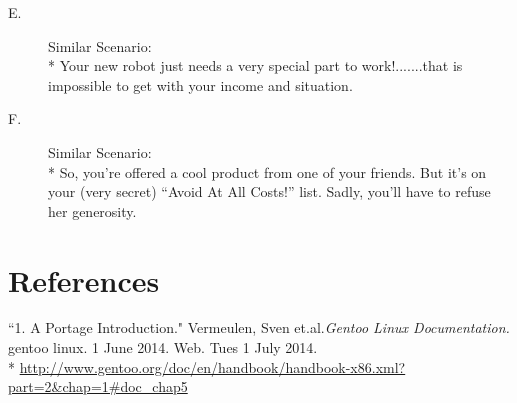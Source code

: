 \documentclass[11pt]{article}
\begin{document}
\begin{description}
   \item[E.] Similar Scenario:
    \\* Your new robot just needs a very special part to work!.......that is impossible to get with your income and situation.
    
   \item[F.] Similar Scenario:
    \\* So, you're offered a cool product from one of your friends. But it's on your (very secret) ``Avoid At All Costs!'' list. Sadly, you'll have to refuse her generosity.
  \end{description}
 
 \pagebreak
 \section*{References}
 ``1. A Portage Introduction." Vermeulen, Sven et.al.\textit{Gentoo Linux Documentation.} gentoo linux. 1 June 2014. Web. Tues 1 July 2014.
 \\* \url{http://www.gentoo.org/doc/en/handbook/handbook-x86.xml?part=2&chap=1#doc_chap5}
\end{document}
